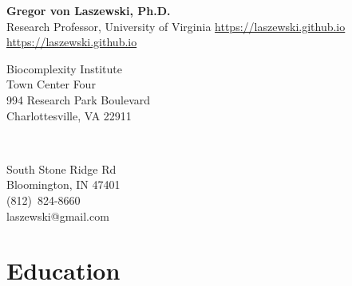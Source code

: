\documentclass{article}
\begin{document}
\setcounter{varseg}{0}
\newcommand{\pbib}{\stepcounter{varseg} \printbibliography[heading=none,resetnumbers=false,segment=\the\numexpr\value{varseg}]}


\begin{center}
  {\huge\bf Gregor von Laszewski, Ph.D.} \\
Research Professor, University of Virginia
\href{https://laszewski.github.io}{https://laszewski.github.io}
\url{https://laszewski.github.io}

\end{center}

\begin{minipage}[t]{0.6\columnwidth}

Biocomplexity Institute \\
Town Center Four \\
994 Research Park Boulevard \\
Charlottesville, VA 22911
\end{minipage}
\ \
\begin{minipage}[t]{0.4\columnwidth}
 South Stone Ridge Rd\\
Bloomington, IN 47401\\
(812)~824-8660\\
laszewski@gmail.com\\
\end{minipage}



\section{Education}
\end{document}
